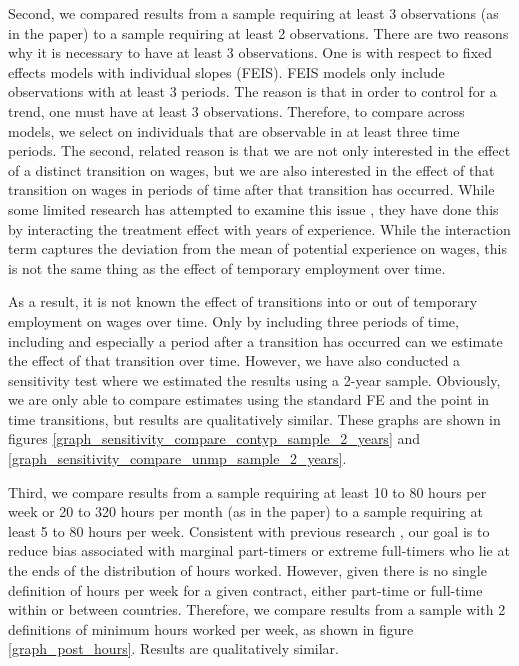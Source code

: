 Second, we compared results from a sample requiring at least 3 observations (as in the paper) to a sample requiring at least 2 observations.  There are two reasons why it is necessary to have at least 3 observations.  One is with respect to fixed effects models with individual slopes (FEIS).  FEIS models only include observations with at least 3 periods.  The reason is that in order to control for a trend, one must have at least 3 observations.  Therefore, to compare across models, we select on individuals that are observable in at least three time periods.  The second, related reason is that we are not only interested in the effect of a distinct transition on wages, but we are also interested in the effect of that transition on wages in periods of time after that transition has occurred.  While some limited research has attempted to examine this issue \citep{booth_temporary_2002,mooi-reci_casual_2017}, they have done this by interacting the treatment effect with years of experience.  While the interaction term captures the deviation from the mean of potential experience on wages, this is not the same thing as the effect of temporary employment over time.  

As a result, it is not known the effect of transitions into or out of temporary employment on wages over time.  Only by including three periods of time, including and especially a period after a transition has occurred can we estimate the effect of that transition over time.  However, we have also conducted a sensitivity test where we estimated the results using a 2-year sample.  Obviously, we are only able to compare estimates using the standard FE and the point in time transitions, but results are qualitatively similar.  These graphs are shown in figures \ref{graph_sensitivity_compare_contyp_sample_2_years} and \ref{graph_sensitivity_compare_unmp_sample_2_years}.  

Third, we compare results from a sample requiring at least 10 to 80 hours per week or 20 to 320 hours per month (as in the paper) to a sample requiring at least 5 to 80 hours per week.  Consistent with previous research \citep{barbieri_dual_2018}, our goal is to reduce bias associated with marginal part-timers or extreme full-timers who lie at the ends of the distribution of hours worked.  However, given there is no single definition of hours per week for a given contract, either part-time or full-time within or between countries.  Therefore, we compare results from a sample with 2 definitions of minimum hours worked per week, as shown in figure \ref{graph_post_hours}.  Results are qualitatively similar. 

